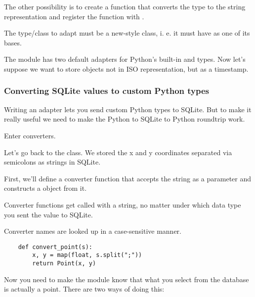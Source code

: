The other possibility is to create a function that converts the type to the
string representation and register the function with .

\begin{notice}
The type/class to adapt must be a new-style class, i. e. it must have
 as one of its bases.
\end{notice}

    

The  module has two default adapters for Python's built-in
 and  types.  Now let's suppose
we want to store  objects not in ISO representation,
but as a \UNIX{} timestamp.

    

\subsubsection{Converting SQLite values to custom Python types}

Writing an adapter lets you send custom Python types to SQLite.
But to make it really useful we need to make the Python to SQLite to Python
roundtrip work.  

Enter converters.

Let's go back to the  class. We stored the x and y
coordinates separated via semicolons as strings in SQLite.

First, we'll define a converter function that accepts the string as a
parameter and constructs a  object from it.

\begin{notice}
Converter functions  get called with a string, no matter
under which data type you sent the value to SQLite.
\end{notice}

\begin{notice}
Converter names are looked up in a case-sensitive manner.
\end{notice}


\begin{verbatim}
    def convert_point(s):
        x, y = map(float, s.split(";"))
        return Point(x, y)
\end{verbatim}

Now you need to make the  module know that what you select from the
database is actually a point. There are two ways of doing this:

